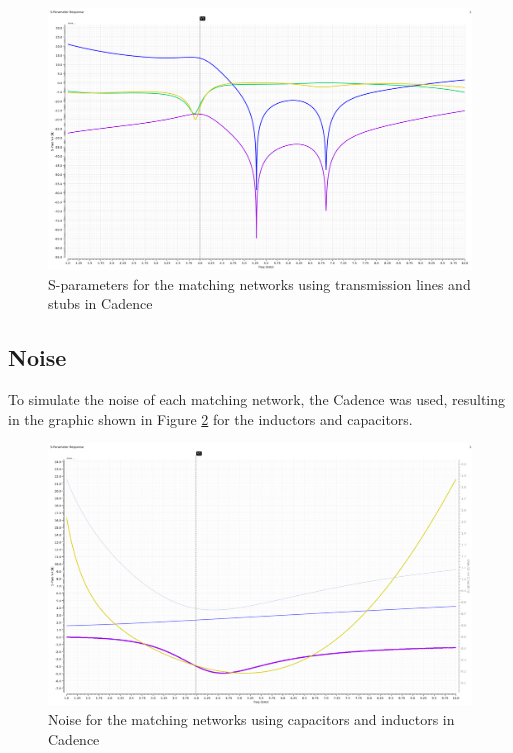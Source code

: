 \begin{figure}[H]
    \centering
    \includegraphics*[scale = 0.3]{Images/LS_matching.png}
    \caption{S-parameters for the matching networks using transmission lines and stubs in Cadence}
    \label{fig:CadenceLS}
\end{figure}

\subsection{Noise}

To simulate the noise of each matching network, the Cadence was used, resulting in the graphic shown in Figure \ref{fig:NoiseLC} for the inductors and capacitors.

\begin{figure}[H]
    \centering
    \includegraphics*[scale = 0.3]{Images/noiseLC.png}
    \caption{Noise for the matching networks using capacitors and inductors in Cadence}
    \label{fig:NoiseLC}
\end{figure}

